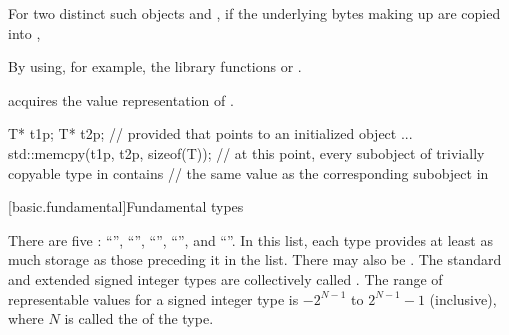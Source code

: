\pnum
For two distinct such objects  and ,
if the underlying bytes making up
 are copied into ,
\begin{footnote}
By using, for example,
the library functions  or .
\end{footnote}
  acquires the value representation of
.
\begin{example}
\begin{codeblock}
T* t1p;
T* t2p;
    // provided that  points to an initialized object ...
std::memcpy(t1p, t2p, sizeof(T));
    // at this point, every subobject of trivially copyable type in  contains
    // the same value as the corresponding subobject in 
\end{codeblock}
\end{example}

[basic.fundamental]{Fundamental types}

\pnum
{}%
There are five :
%
%
%
%
%
``'', ``'', ``'',
``'', and ``''. In
this list, each type provides at least as much storage as those
preceding it in the list.
There may also be 
.
The standard and extended signed integer types are collectively called
.
The range of representable values for a signed integer type is
$-2^{N-1}$ to $2^{N-1}-1$ (inclusive),
where $N$ is called the  of the type.
%

